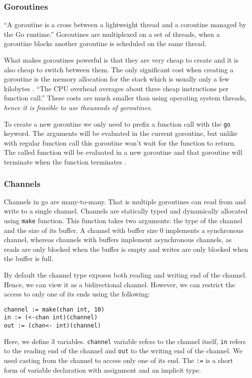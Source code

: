\subsubsection{Goroutines}
``A goroutine is a cross between a lightweight thread and a coroutine
managed by the Go runtime.'' \cite[2]{whitehead} Goroutines are multiplexed
on a set of threads, when a goroutine blocks another goroutine is scheduled
on the same thread. 

What makes goroutines powerful is that they are very cheap to create and 
it is also cheap to switch between them. The only significant cost when 
creating a goroutine is the memory allocation for the stack which is 
usually only a few kilobytes \cite{FAQ}. ``The CPU overhead averages about 
three cheap instructions per function call.''\cite{FAQ} These costs are much 
smaller than using operating system threads, \textit{hence it is feasible to use 
thousands of goroutines}.

To create a new goroutine we only need to prefix a function call with
the \texttt{go} keyword. The arguments will be evaluated in the current
goroutine, but unlike with regular function call this goroutine won't
wait for the function to return. The called 
function will be evaluated in a new goroutine and that goroutine will 
terminate when the function terminates \cite{GoDocumentation}.

\subsubsection{Channels}
Channels in go are many-to-many. That is multiple goroutines can
read from and write to a single channel. Channels are statically typed and
dynamically allocated using \texttt{make} function. This function takes 
two arguments: the type of the channel and the size of its buffer.
A channel with buffer size 0 implements a synchronous channel, whereas 
channels with buffers implement asynchronous channels, as reads
are only blocked when the buffer is empty and writes are only blocked
when the buffer is full.

By default the channel type exposes both reading and writing end of the
channel. Hence, we can view it as a bidirectional channel. 
However, we can restrict the access to only one of its ends using the following:
\begin{lstlisting}
channel := make(chan int, 10)
in := (<-chan int)(channel)
out := (chan<- int)(channel)
\end{lstlisting}
Here, we define 3 variables. \texttt{channel} variable refers to the 
channel itself, \texttt{in} refers to the reading end of the channel
and \texttt{out} to the writing end of the channel. We used casting
from the channel to access only one of its end. The \texttt{:=} is a
short form of variable declaration with assignment and an implicit type.

